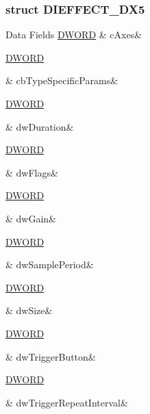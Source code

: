 \subsubsection{struct D\-I\-E\-F\-F\-E\-C\-T\-\_\-\-D\-X5}
\begin{DoxyFields}{Data Fields}
\hypertarget{a00003_a6ef1227420cb5a1a48ac004d53480756}{\hyperlink{a00003_a50e15ae51c87ae06ab29c8148cb5f36c}{D\-W\-O\-R\-D}}\label{a00003_a6ef1227420cb5a1a48ac004d53480756}
&
c\-Axes&
\\
\hline

\hypertarget{a00003_ac6a9b2f7eb98cf2babca1b1dff163459}{\hyperlink{a00003_a50e15ae51c87ae06ab29c8148cb5f36c}{D\-W\-O\-R\-D}}\label{a00003_ac6a9b2f7eb98cf2babca1b1dff163459}
&
cb\-Type\-Specific\-Params&
\\
\hline

\hypertarget{a00003_a7aeace215439e67e8676bb3d6455c37e}{\hyperlink{a00003_a50e15ae51c87ae06ab29c8148cb5f36c}{D\-W\-O\-R\-D}}\label{a00003_a7aeace215439e67e8676bb3d6455c37e}
&
dw\-Duration&
\\
\hline

\hypertarget{a00003_a4d2f405b1141000eb2af256e0fc8b98b}{\hyperlink{a00003_a50e15ae51c87ae06ab29c8148cb5f36c}{D\-W\-O\-R\-D}}\label{a00003_a4d2f405b1141000eb2af256e0fc8b98b}
&
dw\-Flags&
\\
\hline

\hypertarget{a00003_a9c764fcd1d75a20ee67a859f0b15631a}{\hyperlink{a00003_a50e15ae51c87ae06ab29c8148cb5f36c}{D\-W\-O\-R\-D}}\label{a00003_a9c764fcd1d75a20ee67a859f0b15631a}
&
dw\-Gain&
\\
\hline

\hypertarget{a00003_a37f869306a4c4735b1e637b7f9bd5e44}{\hyperlink{a00003_a50e15ae51c87ae06ab29c8148cb5f36c}{D\-W\-O\-R\-D}}\label{a00003_a37f869306a4c4735b1e637b7f9bd5e44}
&
dw\-Sample\-Period&
\\
\hline

\hypertarget{a00003_a669c5a85f5a9eb97e64ad880fadaaa2d}{\hyperlink{a00003_a50e15ae51c87ae06ab29c8148cb5f36c}{D\-W\-O\-R\-D}}\label{a00003_a669c5a85f5a9eb97e64ad880fadaaa2d}
&
dw\-Size&
\\
\hline

\hypertarget{a00003_a12e2027336e025cd2bd5cfe30cea5292}{\hyperlink{a00003_a50e15ae51c87ae06ab29c8148cb5f36c}{D\-W\-O\-R\-D}}\label{a00003_a12e2027336e025cd2bd5cfe30cea5292}
&
dw\-Trigger\-Button&
\\
\hline

\hypertarget{a00003_aa07fcd7eccd253435edb652aba5d870b}{\hyperlink{a00003_a50e15ae51c87ae06ab29c8148cb5f36c}{D\-W\-O\-R\-D}}\label{a00003_aa07fcd7eccd253435edb652aba5d870b}
&
dw\-Trigger\-Repeat\-Interval&
\\
\hline


\end{DoxyFields}
